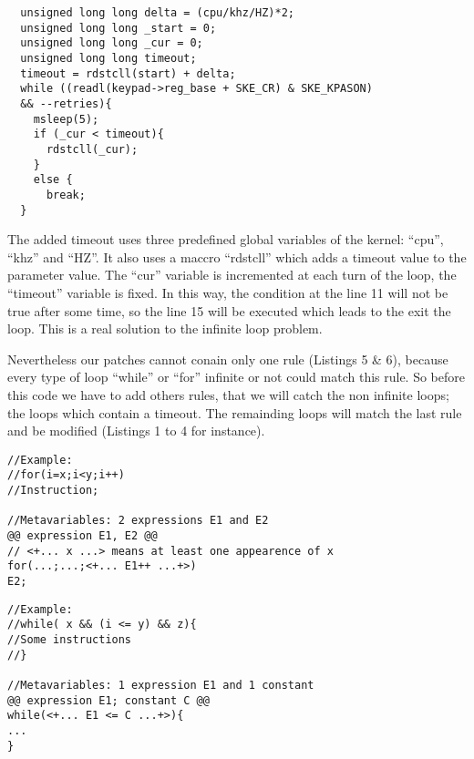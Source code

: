 \documentclass[a4paper,12pt]{article}
\begin{document}
\begin{lstlisting}
  unsigned long long delta = (cpu/khz/HZ)*2; 
  unsigned long long _start = 0; 
  unsigned long long _cur = 0; 
  unsigned long long timeout; 
  timeout = rdstcll(start) + delta; 
  while ((readl(keypad->reg_base + SKE_CR) & SKE_KPASON) 
  && --retries){
    msleep(5);
    if (_cur < timeout){
      rdstcll(_cur);
    }
    else {
      break;
  }
\end{lstlisting}

\vspace{0.5cm}
The added timeout uses three predefined global variables of the kernel: ``cpu'', ``khz'' and ``HZ''. It also uses a maccro ``rdstcll'' which adds a timeout value to the parameter value. The ``cur'' variable is incremented at each turn of the loop, the ``timeout'' variable is fixed. In this way, the condition at the line 11 will not be true after some time, so the line 15 will be executed which leads to the exit the loop. 
This is a real solution to the infinite loop problem.

Nevertheless our patches cannot conain only one rule (Listings 5 \& 6), because every type of loop ``while'' or ``for'' infinite or not could match this rule. So before this code we have to add others rules, that we will catch the non infinite loops; the loops which contain a timeout. The remainding loops will match the last rule and be modified (Listings 1 to 4 for instance).

\begin{lstlisting}
//Example:
//for(i=x;i<y;i++) 
//Instruction;

//Metavariables: 2 expressions E1 and E2 
@@ expression E1, E2 @@ 
// <+... x ...> means at least one appearence of x
for(...;...;<+... E1++ ...+>) 
E2;
\end{lstlisting}

\begin{lstlisting}
//Example:
//while( x && (i <= y) && z){
//Some instructions
//}

//Metavariables: 1 expression E1 and 1 constant
@@ expression E1; constant C @@ 
while(<+... E1 <= C ...+>){
...
}
\end{lstlisting}
\vspace{0.5cm}
\end{document}
